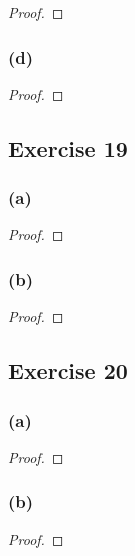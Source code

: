 \documentclass[14pt]{extarticle}
\begin{document}
\begin{proof}

\end{proof}

\subsubsection{(d)}

\begin{proof}

\end{proof}

\subsection{Exercise 19}

\subsubsection{(a)}

\begin{proof}

\end{proof}

\subsubsection{(b)}

\begin{proof}

\end{proof}

\subsection{Exercise 20}

\subsubsection{(a)}

\begin{proof}

\end{proof}

\subsubsection{(b)}

\begin{proof}

\end{proof}
\end{document}
